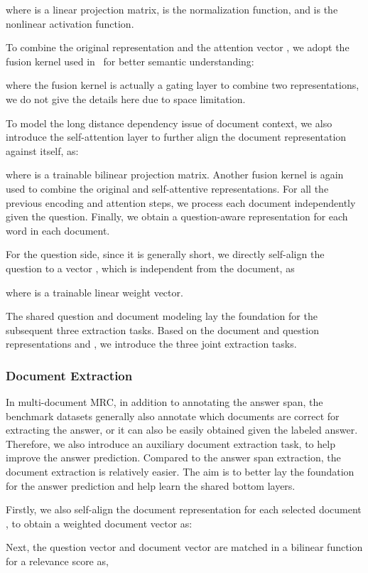 \documentclass[letterpaper]{article} \usepackage{aaai19}  \usepackage{graphicx}
\begin{document}
where  is a linear projection matrix,  is the normalization function, and  is the nonlinear activation function. 

To combine the original representation  and the attention vector , we adopt the fusion kernel used in~\cite{wang2018alibaba} for better semantic understanding: 

where the fusion kernel  is actually a gating layer to combine two representations, we do not give the details here due to space limitation.

To model the long distance dependency issue of document context, we also introduce the self-attention layer to further align the document representation  against itself, as:

where  is a trainable bilinear projection matrix. Another fusion kernel is again used to combine the original and self-attentive representations. For all the previous encoding and attention steps,  we process each document independently given the question. Finally, we obtain a question-aware representation  for each word in each document. 

For the question side, since it is generally short, we directly self-align the question to a vector , which is independent from the document, as

where  is a trainable linear weight vector. 

The shared question and document modeling lay the foundation for the subsequent three extraction tasks. Based on the document and question representations  and , we introduce the three joint extraction tasks.

\subsubsection{Document Extraction}
In multi-document MRC, in addition to annotating the answer span, the benchmark datasets generally also annotate which documents are correct for extracting the answer, or it can also be easily obtained given the labeled answer. Therefore, we also introduce an auxiliary document extraction task, to help improve the answer prediction. Compared to the answer span extraction, the document extraction is relatively easier. The aim is to better lay the foundation for the answer prediction and help learn the shared bottom layers.

Firstly, we also self-align the document representation  for each selected document , to obtain a weighted document vector  as:


Next, the question vector  and document vector  are matched in a bilinear function for a relevance score as,
\end{document}
